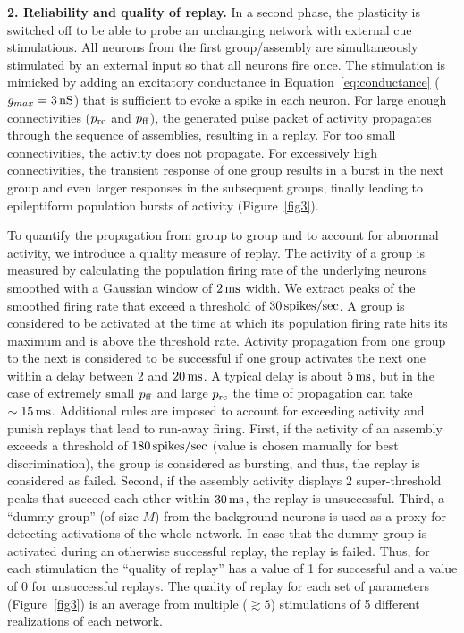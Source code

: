     \textbf{2. Reliability and quality of replay.}
      In a second phase, the plasticity is switched off to be able to probe an
      unchanging network with external cue stimulations. All neurons from the
      first group/assembly are simultaneously stimulated by an external input
      so that all neurons fire once. The stimulation is mimicked by adding an
      excitatory conductance in Equation~\ref{eq:conductance} ($g_{max}= 3 \, \rm
      nS$) that is sufficient to evoke a spike in each neuron. For large enough
      connectivities ($p_{\rm rc}$ and $p_{\rm ff}$), the generated pulse
      packet of activity propagates through the sequence of assemblies,
      resulting in a replay. For too small connectivities, the activity does
      not propagate. For excessively high connectivities, the transient
      response of one group results in a burst in the next group and even
      larger responses in the subsequent groups, finally leading to
      epileptiform population bursts of activity (Figure~\ref{fig3}).

      To quantify the propagation from group to group and to account for
      abnormal activity, we introduce a quality measure of replay. The activity
      of a group is measured by calculating the population firing rate of the
      underlying neurons smoothed with a Gaussian window of $2 \, \rm ms$
      width. We extract peaks of the smoothed firing rate that exceed a
      threshold of $30 \, \rm spikes/sec$. A group is considered to be
      activated at the time at which its population firing rate hits its
      maximum and is above the threshold rate. Activity propagation from one
      group to the next is considered to be successful if one group activates
      the next one within a delay between 2 and $20 \, \rm ms$. A typical delay
      is about $5 \, \rm ms$, but in the case of extremely small $p_{\rm ff}$
      and large $p_{\rm rc}$ the time of propagation can take $\sim 15 \, \rm
      ms$. Additional rules are imposed to account for exceeding activity and
      punish replays that lead to run-away firing.  First, if the activity of
      an assembly exceeds a threshold of $180 \, \rm spikes/sec$ (value is
      chosen manually for best discrimination), the group is considered as
      bursting, and thus, the replay is considered as failed. 
      Second, if the assembly activity displays 2 super-threshold peaks that
      succeed each other within $30\,\rm ms$, the replay is unsuccessful.
      Third, a ``dummy group'' (of size $M$) from the background neurons is
      used as a proxy for detecting activations of the whole network. In case
      that the dummy group is activated during an otherwise successful replay,
      the replay is failed. Thus, for each stimulation the ``quality of
      replay'' has a value of 1 for successful and a value of 0 for
      unsuccessful replays. The quality of replay for each set of parameters
      (Figure~\ref{fig3}) is an average from multiple ($ \gtrsim 5$) stimulations
      of 5 different realizations of each network.

